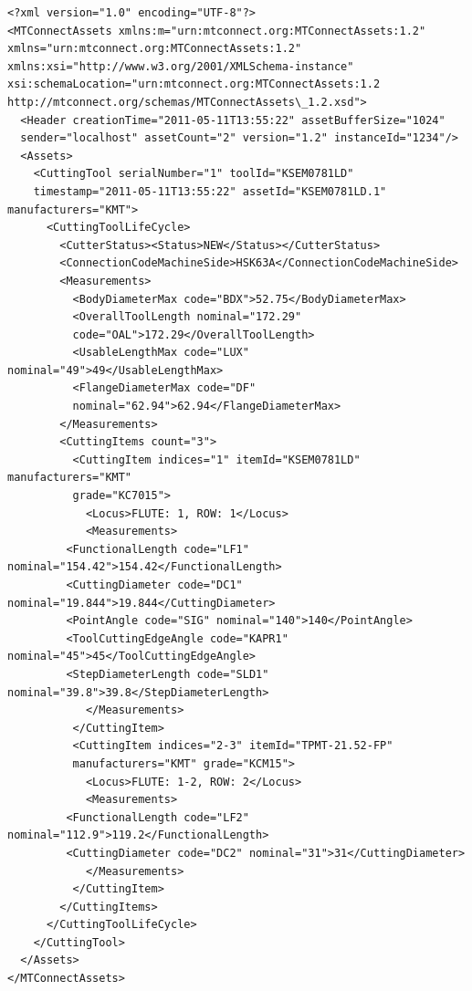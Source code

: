 \documentclass{mtconnect}	%
\begin{document}
\begin{lstlisting}[firstnumber=1,escapechar=|,% 
caption={Example for Step Drill with Explicate Loci}, label={lst:step-drill-with-explicate-loci}]
<?xml version="1.0" encoding="UTF-8"?>
<MTConnectAssets xmlns:m="urn:mtconnect.org:MTConnectAssets:1.2" 
xmlns="urn:mtconnect.org:MTConnectAssets:1.2" 
xmlns:xsi="http://www.w3.org/2001/XMLSchema-instance" 
xsi:schemaLocation="urn:mtconnect.org:MTConnectAssets:1.2 
http://mtconnect.org/schemas/MTConnectAssets\_1.2.xsd">
  <Header creationTime="2011-05-11T13:55:22" assetBufferSize="1024" 
  sender="localhost" assetCount="2" version="1.2" instanceId="1234"/>
  <Assets>
    <CuttingTool serialNumber="1" toolId="KSEM0781LD" 
    timestamp="2011-05-11T13:55:22" assetId="KSEM0781LD.1" manufacturers="KMT">
      <CuttingToolLifeCycle>
        <CutterStatus><Status>NEW</Status></CutterStatus>
        <ConnectionCodeMachineSide>HSK63A</ConnectionCodeMachineSide>
        <Measurements>
          <BodyDiameterMax code="BDX">52.75</BodyDiameterMax>
          <OverallToolLength nominal="172.29" 
          code="OAL">172.29</OverallToolLength>
          <UsableLengthMax code="LUX" nominal="49">49</UsableLengthMax>
          <FlangeDiameterMax code="DF" 
          nominal="62.94">62.94</FlangeDiameterMax>
        </Measurements>
        <CuttingItems count="3">
          <CuttingItem indices="1" itemId="KSEM0781LD" manufacturers="KMT" 
          grade="KC7015">
            <Locus>FLUTE: 1, ROW: 1</Locus>
            <Measurements>
         <FunctionalLength code="LF1" nominal="154.42">154.42</FunctionalLength>
         <CuttingDiameter code="DC1" nominal="19.844">19.844</CuttingDiameter>
         <PointAngle code="SIG" nominal="140">140</PointAngle>
         <ToolCuttingEdgeAngle code="KAPR1" nominal="45">45</ToolCuttingEdgeAngle>
         <StepDiameterLength code="SLD1" nominal="39.8">39.8</StepDiameterLength>
            </Measurements>
          </CuttingItem>
          <CuttingItem indices="2-3" itemId="TPMT-21.52-FP" 
          manufacturers="KMT" grade="KCM15">
            <Locus>FLUTE: 1-2, ROW: 2</Locus>
            <Measurements>
         <FunctionalLength code="LF2" nominal="112.9">119.2</FunctionalLength>
         <CuttingDiameter code="DC2" nominal="31">31</CuttingDiameter>
            </Measurements>
          </CuttingItem>
        </CuttingItems>
      </CuttingToolLifeCycle>
    </CuttingTool>
  </Assets>
</MTConnectAssets>
\end{lstlisting}

\pagebreak
\end{document}

